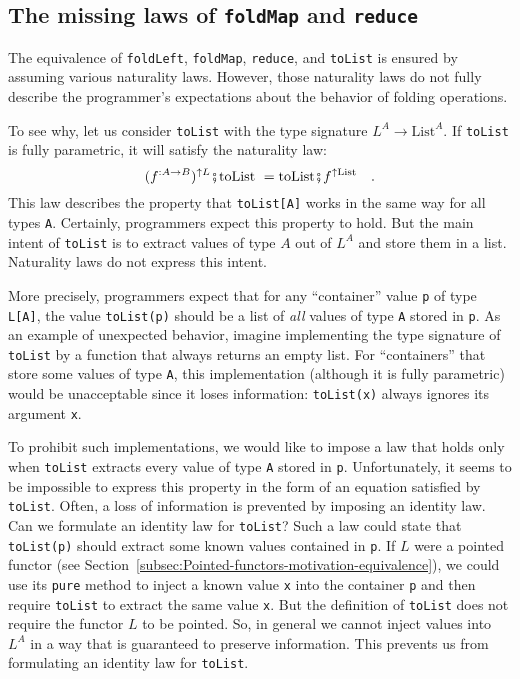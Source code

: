 \subsection{The missing laws of \texttt{foldMap} and \texttt{reduce}}

The equivalence of \lstinline!foldLeft!, \lstinline!foldMap!, \lstinline!reduce!,
and \lstinline!toList! is ensured by assuming various naturality
laws. However, those naturality laws do not fully describe the programmer\textsf{'}s
expectations about the behavior of folding operations. 

To see why, let us consider \lstinline!toList! with the type signature
$L^{A}\rightarrow\text{List}^{A}$. If \lstinline!toList! is fully
parametric, it will satisfy the naturality law:
\[
(f^{:A\rightarrow B})^{\uparrow L}\bef\text{toList }=\text{toList}\bef f^{\uparrow\text{List}}\quad.
\]
This law describes the property that \lstinline!toList[A]! works
in the same way for all types \lstinline!A!. Certainly, programmers
expect this property to hold. But the main intent of \lstinline!toList!
is to extract values of type $A$ out of $L^{A}$ and store them in
a list. Naturality laws do not express this intent.

More precisely, programmers expect that for any \textsf{``}container\textsf{''} value
\lstinline!p! of type \lstinline!L[A]!, the value \lstinline!toList(p)!
should be a list of \emph{all} values of type \lstinline!A! stored
in \lstinline!p!. As an example of unexpected behavior, imagine implementing
the type signature of \lstinline!toList! by a function that always
returns an empty list. For \textsf{``}containers\textsf{''} that store some values
of type \lstinline!A!, this implementation (although it is fully
parametric) would be unacceptable since it loses information: \lstinline!toList(x)!
always ignores its argument \lstinline!x!.

To prohibit such implementations, we would like to impose a law that
holds only when \lstinline!toList! extracts every value of type \lstinline!A!
stored in \lstinline!p!. Unfortunately, it seems to be impossible
to express this property in the form of an equation satisfied by \lstinline!toList!.
Often, a loss of information is prevented by imposing an identity
law. Can we formulate an identity law for \lstinline!toList!? Such
a law could state that \lstinline!toList(p)! should extract some
known values contained in \lstinline!p!. If $L$ were a pointed functor
(see Section~\ref{subsec:Pointed-functors-motivation-equivalence}),
we could use its \lstinline!pure! method to inject a known value
\lstinline!x! into the container \lstinline!p! and then require
\lstinline!toList! to extract the same value \lstinline!x!. But
the definition of \lstinline!toList! does not require the functor
$L$ to be pointed. So, in general we cannot inject values into $L^{A}$
in a way that is guaranteed to preserve information. This prevents
us from formulating an identity law for \lstinline!toList!.


